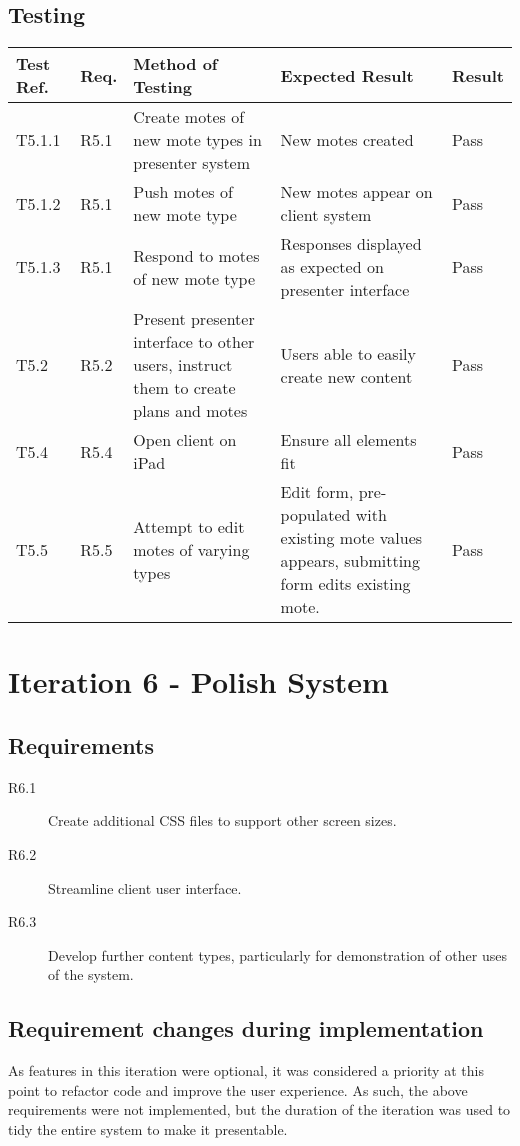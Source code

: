\documentclass[a4papert,11pt,notitlepage]{article}
\begin{document}
\subsection{Testing}
\begin{tabular}{p{30pt} | p{25pt} | p{140pt} | p{140pt} || p{90pt}}
Test Ref. & Req. & Method of Testing & Expected Result & Result \\ \hline
T5.1.1 & R5.1 & Create motes of new mote types in presenter system & New motes created & Pass \\
T5.1.2 & R5.1 & Push motes of new mote type & New motes appear on client system & Pass \\
T5.1.3 & R5.1 & Respond to motes of new mote type & Responses displayed as expected on presenter interface & Pass \\
T5.2 & R5.2 & Present presenter interface to other users, instruct them to create plans and motes & Users able to easily create new content & Pass \\
T5.4 & R5.4 & Open client on iPad & Ensure all elements fit & Pass \\
T5.5 & R5.5 & Attempt to edit motes of varying types & Edit form, pre-populated with existing mote values appears, submitting form edits existing mote. & Pass \\
\end{tabular}

\section{Iteration 6 - Polish System}
\subsection{Requirements}
\begin{description}
\item[R6.1] Create additional CSS files to support other screen sizes.
\item[R6.2] Streamline client user interface.
\item[R6.3] Develop further content types, particularly for demonstration of other uses of the system.
\end{description}

\subsection{Requirement changes during implementation}
As features in this iteration were optional, it was considered a priority at this point to refactor code and improve the user experience. As such, the above requirements were not implemented, but the duration of the iteration was used to tidy the entire system to make it presentable.
\end{document}
